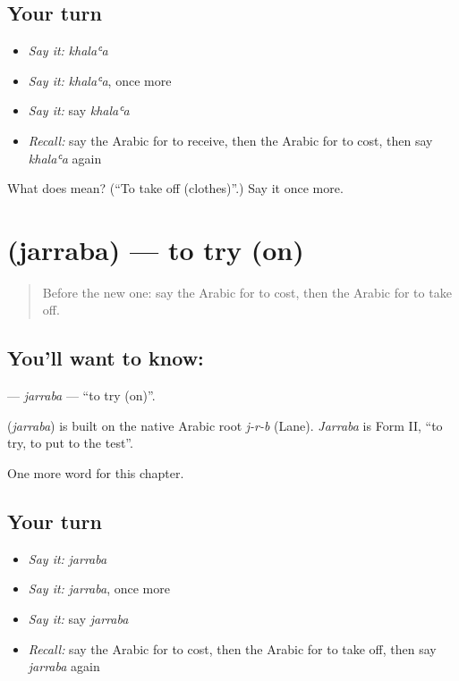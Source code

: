 \subsection*{Your turn}
\begin{itemize}
\raggedright
  \item \emph{Say it:} \emph{khalaʿa}
  \item \emph{Say it:} \emph{khalaʿa}, once more
  \item \emph{Say it:} say \emph{khalaʿa}
  \item \emph{Recall:} say the Arabic for to receive, then the Arabic for to cost, then say \emph{khalaʿa} again
\end{itemize}

\begin{tcolorbox}[breakable,colback=teal!4,colframe=teal!35!black,title={Before you move on}]
What does  mean? (\textquotedblleft{}To take off (clothes)\textquotedblright{}.) Say it once more.
\end{tcolorbox}
\section[\texorpdfstring{\ar{جرب} (jarraba)}{جرب (jarraba)}]{ (jarraba) — to try (on)}

\label{lesson:AR-C193-jarraba}



\begin{quote}
Before the new one: say the Arabic for to cost, then the Arabic for to take off.
\end{quote}

\subsection*{You'll want to know: }
\textbf{} — \emph{jarraba} — \textquotedblleft{}to try (on)\textquotedblright{}.

\begin{cousinweb}
\textbf{} (\emph{jarraba}) is built on the native Arabic root \emph{j-r-b} (Lane). \emph{Jarraba} is Form II, \textquotedblleft{}to try, to put to the test\textquotedblright{}.
\end{cousinweb}

\begin{grammarlens}[title={What you've built}]
One more word for this chapter.
\end{grammarlens}

\subsection*{Your turn}
\begin{itemize}
\raggedright
  \item \emph{Say it:} \emph{jarraba}
  \item \emph{Say it:} \emph{jarraba}, once more
  \item \emph{Say it:} say \emph{jarraba}
  \item \emph{Recall:} say the Arabic for to cost, then the Arabic for to take off, then say \emph{jarraba} again
\end{itemize}

